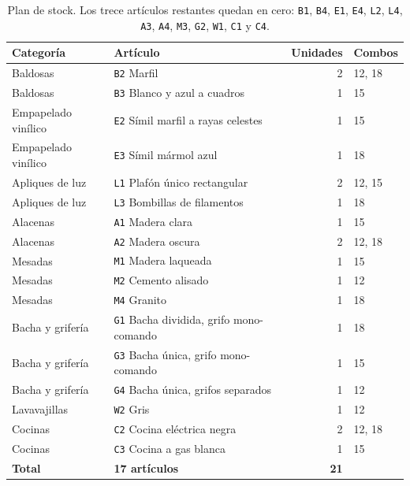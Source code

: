 \documentclass[10pt,a4paper]{article}
\newcommand{\art}[1]{\texttt{#1}}
\begin{document}
\begin{table}[H]
\centering\footnotesize
\renewcommand{\arraystretch}{0.95}
\caption{Plan de stock. Los trece artículos restantes quedan en cero: \art{B1},
\art{B4}, \art{E1}, \art{E4}, \art{L2}, \art{L4}, \art{A3}, \art{A4}, \art{M3},
\art{G2}, \art{W1}, \art{C1} y \art{C4}.}
\label{tab:stock_e1}
\begin{tabular}{llrl}
\toprule
\textbf{Categoría} & \textbf{Artículo} & \textbf{Unidades} & \textbf{Combos} \\
\midrule
Baldosas            & \art{B2} Marfil                        & 2 & 12, 18 \\
Baldosas            & \art{B3} Blanco y azul a cuadros       & 1 & 15 \\
Empapelado vinílico & \art{E2} Símil marfil a rayas celestes & 1 & 15 \\
Empapelado vinílico & \art{E3} Símil mármol azul             & 1 & 18 \\
Apliques de luz     & \art{L1} Plafón único rectangular      & 2 & 12, 15 \\
Apliques de luz     & \art{L3} Bombillas de filamentos       & 1 & 18 \\
Alacenas            & \art{A1} Madera clara                  & 1 & 15 \\
Alacenas            & \art{A2} Madera oscura                 & 2 & 12, 18 \\
Mesadas             & \art{M1} Madera laqueada               & 1 & 15 \\
Mesadas             & \art{M2} Cemento alisado               & 1 & 12 \\
Mesadas             & \art{M4} Granito                       & 1 & 18 \\
Bacha y grifería    & \art{G1} Bacha dividida, grifo mono-comando & 1 & 18 \\
Bacha y grifería    & \art{G3} Bacha única, grifo mono-comando    & 1 & 15 \\
Bacha y grifería    & \art{G4} Bacha única, grifos separados      & 1 & 12 \\
Lavavajillas        & \art{W2} Gris                          & 1 & 12 \\
Cocinas             & \art{C2} Cocina eléctrica negra        & 2 & 12, 18 \\
Cocinas             & \art{C3} Cocina a gas blanca           & 1 & 15 \\
\midrule
\textbf{Total} & \textbf{17 artículos} & \textbf{21} & \\
\bottomrule
\end{tabular}
\end{table}
\end{document}
